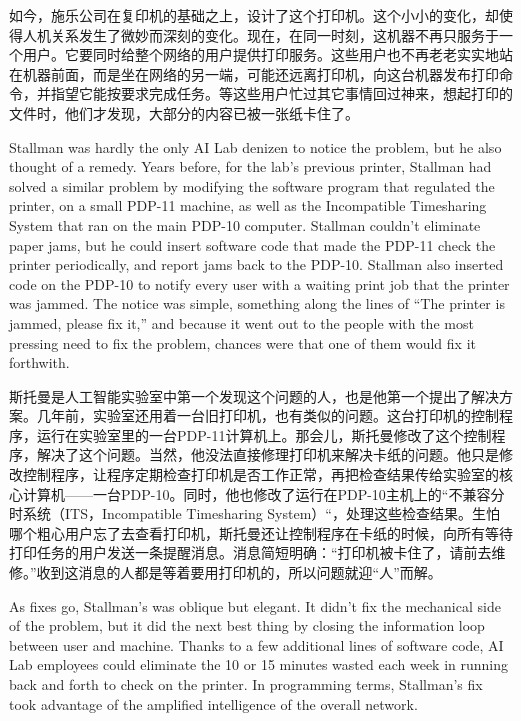 \ifdefined\chs
如今，施乐公司在复印机的基础之上，设计了这个打印机。这个小小的变化，却使得人机关系发生了微妙而深刻的变化。现在，在同一时刻，这机器不再只服务于一个用户。它要同时给整个网络的用户提供打印服务。这些用户也不再老老实实地站在机器前面，而是坐在网络的另一端，可能还远离打印机，向这台机器发布打印命令，并指望它能按要求完成任务。等这些用户忙过其它事情回过神来，想起打印的文件时，他们才发现，大部分的内容已被一张纸卡住了。
\fi

\ifdefined\eng
Stallman was hardly the only AI Lab denizen to notice the problem, but he also thought of a remedy. Years before, for the lab's previous printer, Stallman had solved a similar problem by modifying the software program that regulated the printer, on a small PDP-11 machine, as well as the Incompatible Timesharing System that ran on the main PDP-10 computer. Stallman couldn't eliminate paper jams, but he could insert software code that made the PDP-11 check the printer periodically, and report jams back to the PDP-10. Stallman also inserted code on the PDP-10 to notify every user with a waiting print job that the printer was jammed. The notice was simple, something along the lines of ``The printer is jammed, please fix it,'' and because it went out to the people with the most pressing need to fix the problem, chances were that one of them would fix it forthwith.
\fi

\ifdefined\chs
斯托曼是人工智能实验室中第一个发现这个问题的人，也是他第一个提出了解决方案。几年前，实验室还用着一台旧打印机，也有类似的问题。这台打印机的控制程序，运行在实验室里的一台PDP-11计算机上。那会儿，斯托曼修改了这个控制程序，解决了这个问题。当然，他没法直接修理打印机来解决卡纸的问题。他只是修改控制程序，让程序定期检查打印机是否工作正常，再把检查结果传给实验室的核心计算机——一台PDP-10。同时，他也修改了运行在PDP-10主机上的“不兼容分时系统（ITS，Incompatible Timesharing System）“，处理这些检查结果。生怕哪个粗心用户忘了去查看打印机，斯托曼还让控制程序在卡纸的时候，向所有等待打印任务的用户发送一条提醒消息。消息简短明确：“打印机被卡住了，请前去维修。”收到这消息的人都是等着要用打印机的，所以问题就迎“人”而解。
\fi

\ifdefined\eng
As fixes go, Stallman's was oblique but elegant. It didn't fix the mechanical side of the problem, but it did the next best thing by closing the information loop between user and machine. Thanks to a few additional lines of software code, AI Lab employees could eliminate the 10 or 15 minutes wasted each week in running back and forth to check on the printer. In programming terms, Stallman's fix took advantage of the amplified intelligence of the overall network.
\fi

